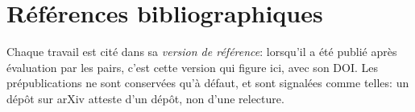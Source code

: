 \documentclass[11pt,a4paper]{article}
\begin{document}
\clearpage
\section*{Références bibliographiques}

\noindent\small Chaque travail est cité dans sa \emph{version de référence}: lorsqu'il a été
publié après évaluation par les pairs, c'est cette version qui figure ici, avec son DOI.
Les prépublications ne sont conservées qu'à défaut, et sont signalées comme telles: un
dépôt sur arXiv atteste d'un dépôt, non d'une relecture.

\medskip

\begingroup
\renewcommand{\section}[2]{}
\end{document}
